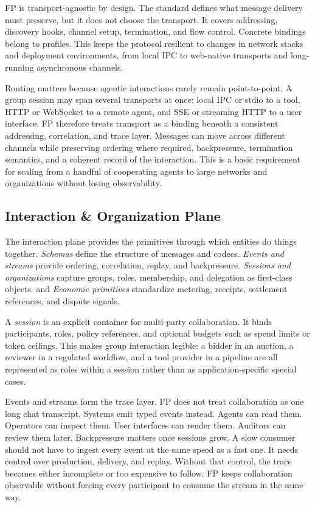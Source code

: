 \documentclass{foundationpaper}
\begin{document}
FP is transport-agnostic by design. The standard defines what message delivery must preserve, but it does not choose the transport. It covers addressing, discovery hooks, channel setup, termination, and flow control. Concrete bindings belong to profiles. This keeps the protocol resilient to changes in network stacks and deployment environments, from local IPC to web-native transports and long-running asynchronous channels.

Routing matters because agentic interactions rarely remain point-to-point. A group session may span several transports at once: local IPC or stdio to a tool, HTTP or WebSocket to a remote agent, and SSE or streaming HTTP to a user interface. FP therefore treats transport as a binding beneath a consistent addressing, correlation, and trace layer. Messages can move across different channels while preserving ordering where required, backpressure, termination semantics, and a coherent record of the interaction. This is a basic requirement for scaling from a handful of cooperating agents to large networks and organizations without losing observability.


\subsection{Interaction \& Organization Plane}
\label{subsec:interaction}

The interaction plane provides the primitives through which entities do things together. \emph{Schemas} define the structure of messages and codecs. \emph{Events and streams} provide ordering, correlation, replay, and backpressure. \emph{Sessions and organizations} capture groups, roles, membership, and delegation as first-class objects. and \emph{Economic primitives} standardize metering, receipts, settlement references, and dispute signals.

A \emph{session} is an explicit container for multi-party collaboration. It binds participants, roles, policy references, and optional budgets such as spend limits or token ceilings. This makes group interaction legible: a bidder in an auction, a reviewer in a regulated workflow, and a tool provider in a pipeline are all represented as roles within a session rather than as application-specific special cases.

Events and streams form the trace layer. FP does not treat collaboration as one long chat transcript. Systems emit typed events instead. Agents can read them. Operators can inspect them. User interfaces can render them. Auditors can review them later.
Backpressure matters once sessions grow. A slow consumer should not have to ingest every event at the same speed as a fast one. It needs control over production, delivery, and replay. Without that control, the trace becomes either incomplete or too expensive to follow. FP keeps collaboration observable without forcing every participant to consume the stream in the same way.
\end{document}
